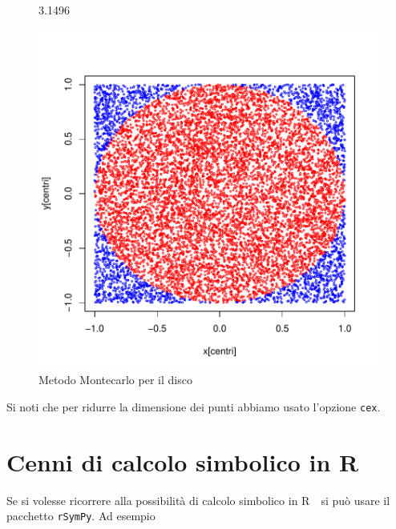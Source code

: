 \documentclass[onecolumn,11pt]{book}
\newcommand{\rpr}{\textsf{R}~}
\begin{document}
\begin{figure}[htbp]
\begin{center}
\begin{Schunk}
\begin{Soutput}
[1] 3.1496
\end{Soutput}
\end{Schunk}
\includegraphics{Rmatematica-161}
\caption{Metodo Montecarlo per il disco}
\label{fig:montecarlo}
\end{center}
\end{figure}
 Si noti che per ridurre la dimensione dei punti abbiamo usato l'opzione \texttt{cex}.
\section{Cenni di calcolo simbolico in \rpr}
Se si volesse ricorrere alla possibilit\`a di calcolo simbolico in \rpr\ si pu\`o usare il pacchetto \texttt{rSymPy}. Ad esempio
\end{document}
